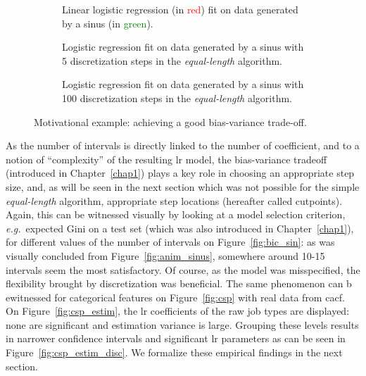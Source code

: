 \begin{figure}[!ht]
\begin{subfigure}[t]{\textwidth}
\centering \resizebox{.8\textwidth}{!}{}
\caption{\label{fig:sinus_lin} Linear logistic regression (in \textcolor{red}{red}) fit on data generated by a sinus (in \textcolor{green}{green}).}
\end{subfigure}
\begin{subfigure}[t]{\textwidth}
\centering \resizebox{.8\textwidth}{!}{}
\caption{\label{fig:sinus_deb} Logistic regression fit on data generated by a sinus with 5 discretization steps in the \textit{equal-length} algorithm.}
\end{subfigure}
\begin{subfigure}[t]{\textwidth}
\centering \resizebox{.8\textwidth}{!}{}
\caption{\label{fig:sinus_fin} Logistic regression fit on data generated by a sinus with 100 discretization steps in the \textit{equal-length} algorithm.}
\end{subfigure}
\caption{Motivational example: achieving a good bias-variance trade-off.}
\label{fig:sin_trois}
\end{figure}
 
As the number of intervals is directly linked to the number of coefficient, and to a notion of ``complexity'' of the resulting \gls{lr} model, the bias-variance tradeoff (introduced in Chapter~\ref{chap1}) plays a key role in choosing an appropriate step size, and, as will be seen in the next section which was not possible for the simple \textit{equal-length} algorithm, appropriate step locations (hereafter called cutpoints). Again, this can be witnessed visually by looking at a model selection criterion, \textit{e.g.}\ expected Gini on a test set (which was also introduced in Chapter~\ref{chap1}), for different values of the number of intervals on Figure~\ref{fig:bic_sin}: as was visually concluded from Figure~\ref{fig:anim_sinus}, somewhere around 10-15 intervals seem the most satisfactory. Of course, as the model was misspecified, the flexibility brought by discretization was beneficial. The same phenomenon can b ewitnessed for categorical features on Figure~\ref{fig:csp} with real data from \gls{cacf}. On Figure~\ref{fig:csp_estim}, the \gls{lr} coefficients of the raw job types are displayed: none are significant and estimation variance is large. Grouping these levels results in narrower confidence intervals and significant \gls{lr} parameters as can be seen in Figure~\ref{fig:csp_estim_disc}.
We formalize these empirical findings in the next section.



